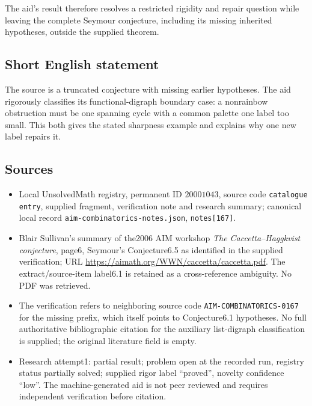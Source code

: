 \documentclass[11pt]{article}
\begin{document}
The aid's result therefore resolves a restricted rigidity and repair question while leaving the complete Seymour conjecture, including its missing inherited hypotheses, outside the supplied theorem.
\subsection{Short English statement}
The source is a truncated conjecture with missing earlier hypotheses. The aid rigorously classifies its functional-digraph boundary case: a nonrainbow obstruction must be one spanning cycle with a common palette one label too small. This both gives the stated sharpness example and explains why one new label repairs it.
\subsection{Sources}
\begin{itemize}
\item Local UnsolvedMath registry, permanent ID $20001043$, source code \texttt{catalogue entry}, supplied fragment, verification note and research summary; canonical local record \texttt{aim-combinatorics-notes.json}, \texttt{notes[167]}.
\item Blair Sullivan's summary of the2006 AIM workshop \emph{The Caccetta--Haggkvist conjecture}, page6, Seymour's Conjecture6.5 as identified in the supplied verification; URL \url{https://aimath.org/WWN/caccetta/caccetta.pdf}. The extract/source-item label6.1 is retained as a cross-reference ambiguity. No PDF was retrieved.
\item The verification refers to neighboring source code \texttt{AIM-COMBINATORICS-0167} for the missing prefix, which itself points to Conjecture6.1 hypotheses. No full authoritative bibliographic citation for the auxiliary list-digraph classification is supplied; the original literature field is empty.
\item Research attempt1: partial result; problem open at the recorded run, registry status partially solved; supplied rigor label ``proved'', novelty confidence ``low''. The machine-generated aid is not peer reviewed and requires independent verification before citation.
\end{itemize}
\end{document}
